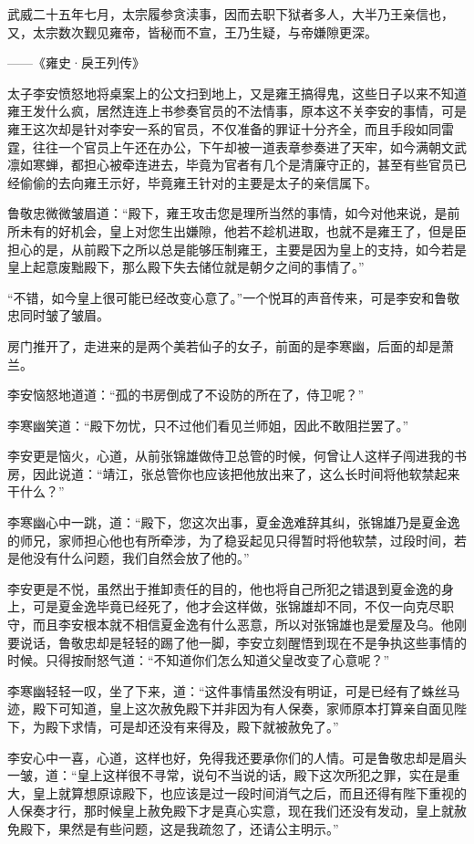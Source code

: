 武威二十五年七月，太宗履参贪渎事，因而去职下狱者多人，大半乃王亲信也，又，太宗数次觐见雍帝，皆秘而不宣，王乃生疑，与帝嫌隙更深。

——《雍史·戾王列传》

太子李安愤怒地将桌案上的公文扫到地上，又是雍王搞得鬼，这些日子以来不知道雍王发什么疯，居然连连上书参奏官员的不法情事，原本这不关李安的事情，可是雍王这次却是针对李安一系的官员，不仅准备的罪证十分齐全，而且手段如同雷霆，往往一个官员上午还在办公，下午却被一道表章参奏进了天牢，如今满朝文武凛如寒蝉，都担心被牵连进去，毕竟为官者有几个是清廉守正的，甚至有些官员已经偷偷的去向雍王示好，毕竟雍王针对的主要是太子的亲信属下。

鲁敬忠微微皱眉道：“殿下，雍王攻击您是理所当然的事情，如今对他来说，是前所未有的好机会，皇上对您生出嫌隙，他若不趁机进取，也就不是雍王了，但是臣担心的是，从前殿下之所以总是能够压制雍王，主要是因为皇上的支持，如今若是皇上起意废黜殿下，那么殿下失去储位就是朝夕之间的事情了。”

“不错，如今皇上很可能已经改变心意了。”一个悦耳的声音传来，可是李安和鲁敬忠同时皱了皱眉。

房门推开了，走进来的是两个美若仙子的女子，前面的是李寒幽，后面的却是萧兰。

李安恼怒地道道：“孤的书房倒成了不设防的所在了，侍卫呢？”

李寒幽笑道：“殿下勿忧，只不过他们看见兰师姐，因此不敢阻拦罢了。”

李安更是恼火，心道，从前张锦雄做侍卫总管的时候，何曾让人这样子闯进我的书房，因此说道：“靖江，张总管你也应该把他放出来了，这么长时间将他软禁起来干什么？”

李寒幽心中一跳，道：“殿下，您这次出事，夏金逸难辞其纠，张锦雄乃是夏金逸的师兄，家师担心他也有所牵涉，为了稳妥起见只得暂时将他软禁，过段时间，若是他没有什么问题，我们自然会放了他的。”

李安更是不悦，虽然出于推卸责任的目的，他也将自己所犯之错退到夏金逸的身上，可是夏金逸毕竟已经死了，他才会这样做，张锦雄却不同，不仅一向克尽职守，而且李安根本就不相信夏金逸有什么恶意，所以对张锦雄也是爱屋及乌。他刚要说话，鲁敬忠却是轻轻的踢了他一脚，李安立刻醒悟到现在不是争执这些事情的时候。只得按耐怒气道：“不知道你们怎么知道父皇改变了心意呢？”

李寒幽轻轻一叹，坐了下来，道：“这件事情虽然没有明证，可是已经有了蛛丝马迹，殿下可知道，皇上这次赦免殿下并非因为有人保奏，家师原本打算亲自面见陛下，为殿下求情，可是却还没有来得及，殿下就被赦免了。”

李安心中一喜，心道，这样也好，免得我还要承你们的人情。可是鲁敬忠却是眉头一皱，道：“皇上这样很不寻常，说句不当说的话，殿下这次所犯之罪，实在是重大，皇上就算想原谅殿下，也应该是过一段时间消气之后，而且还得有陛下重视的人保奏才行，那时候皇上赦免殿下才是真心实意，现在我们还没有发动，皇上就赦免殿下，果然是有些问题，这是我疏忽了，还请公主明示。”

